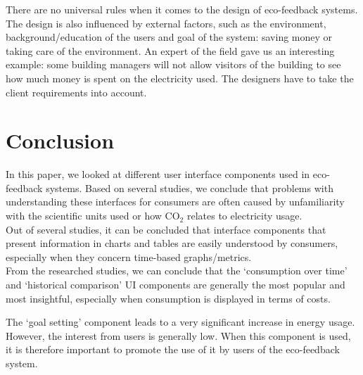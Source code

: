 \documentclass[journal]{vgtc}                %
\begin{document}
There are no universal rules when it comes to the design of eco-feedback systems. The design is also influenced by external factors, such as the environment, background/education of the users and goal of the system: saving money or taking care of the environment.
An expert of the field gave us an interesting example: some building managers will not allow visitors of the building to see how much money is spent on the electricity used. The designers have to take the client requirements into account.


% 
%
%
%
%



\section{Conclusion}
In this paper, we looked at different user interface components used in eco-feedback systems. Based on several studies, we conclude that problems with understanding these interfaces for consumers are often caused by unfamiliarity with the scientific units used or how CO$_2$ relates to electricity usage. \\

Out of several studies, it can be concluded that interface components that present information in charts and tables are easily understood by consumers, especially when they concern time-based graphs/metrics. \\

From the researched studies, we can conclude that the `consumption over time' and `historical comparison' UI components are generally the most popular and most insightful, especially when consumption is displayed in terms of costs.

The `goal setting' component leads to a very significant increase in energy usage. However, the interest from users is generally low. When this component is used, it is therefore important to promote the use of it by users of the eco-feedback system.
\end{document}
